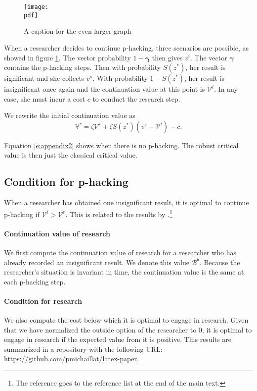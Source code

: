 \documentclass[letterpaper,12pt,leqno]{article}
\newcommand{\pdf}{figures.pdf}
\begin{document}
\begin{figure}[t]
\texttt{[image: \\pdf]}
\caption{A caption for the even larger graph}
\label{f:appendix2}\end{figure}

When a researcher decides to continue p-hacking, three scenarios are possible, as showed in figure \ref{f:appendix2}. The vector probability $1-\bm{\gamma}$ then gives $v^i$. The vector $\bm{\gamma}$ contains the p-hacking steps. Then with probability $S(z^*)$, her result is significant and she collects $v^s$. With probability $1-S(z^*)$, her result is insignificant once again and the continuation value at this point is $\mathcal{V}^i$. In any case, she must incur a cost $c$ to conduct the research step. 

We rewrite the initial continuation value as
\begin{equation}
\mathbb{V}^r = \zeta \mathcal{V}^i + \zeta S(z^*) (v^s - \mathcal{V}^i) - c.
\label{e:appendix2}\end{equation}

Equation \eqref{e:appendix2} shows when there is no p-hacking. The robust critical value is then just the classical critical value. 

\subsection{Condition for p-hacking}\label{a:subappendix}

When a researcher has obtained one insignificant result, it is optimal to continue p-hacking if $\mathcal{V}^i > \mathcal{V}^r$. This is related to the results by \citet{MS21b}.\footnote{The reference goes to the reference list at the end of the main text.}

\paragraph{Continuation value of research} We first compute the continuation value of research for a researcher who has already recorded an insignificant result. We denote this value $\mathcal{B}^\theta$. Because the researcher's situation is invariant in time, the continuation value is the same at each p-hacking step. 

\paragraph{Condition for research} We also compute the cost below which it is optimal to engage in research. Given that we have normalized the outside option of the researcher to $0$, it is optimal to engage in research if the expected value from it is positive. This results are summarized in a repository with the following URL: \url{https://github.com/pmichaillat/latex-paper}.
\end{document}
